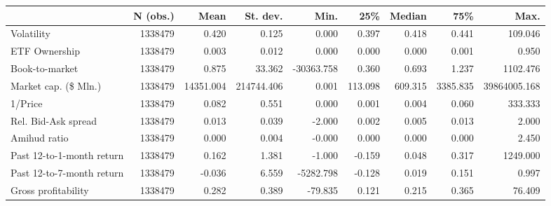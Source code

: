 \begin{tabular}{lrrrrrrrr}
\toprule
{} & N (obs.) &      Mean &   St. dev. &       Min. &     25\% &  Median &      75\% &         Max. \\
\midrule
Volatility                &  1338479 &     0.420 &      0.125 &      0.000 &   0.397 &   0.418 &    0.441 &      109.046 \\
ETF Ownership             &  1338479 &     0.003 &      0.012 &      0.000 &   0.000 &   0.000 &    0.001 &        0.950 \\
Book-to-market            &  1338479 &     0.875 &     33.362 & -30363.758 &   0.360 &   0.693 &    1.237 &     1102.476 \\
Market cap. (\$ Mln.)      &  1338479 & 14351.004 & 214744.406 &      0.001 & 113.098 & 609.315 & 3385.835 & 39864005.168 \\
1/Price                   &  1338479 &     0.082 &      0.551 &      0.000 &   0.001 &   0.004 &    0.060 &      333.333 \\
Rel. Bid-Ask spread       &  1338479 &     0.013 &      0.039 &     -2.000 &   0.002 &   0.005 &    0.013 &        2.000 \\
Amihud ratio              &  1338479 &     0.000 &      0.004 &     -0.000 &   0.000 &   0.000 &    0.000 &        2.450 \\
Past 12-to-1-month return &  1338479 &     0.162 &      1.381 &     -1.000 &  -0.159 &   0.048 &    0.317 &     1249.000 \\
Past 12-to-7-month return &  1338479 &    -0.036 &      6.559 &  -5282.798 &  -0.128 &   0.019 &    0.151 &        0.997 \\
Gross profitability       &  1338479 &     0.282 &      0.389 &    -79.835 &   0.121 &   0.215 &    0.365 &       76.409 \\
\bottomrule
\end{tabular}
